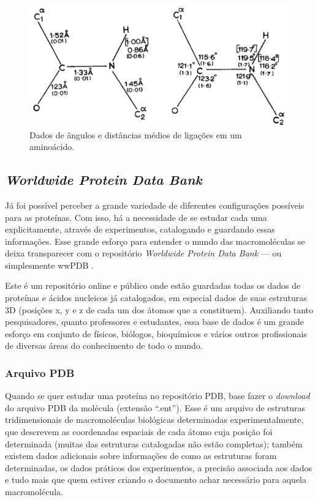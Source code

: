 \documentclass[a4paper,12pt]{article}
\begin{document}
	\begin{figure}[H]
		\begin{center}
			\includegraphics[width=0.8\linewidth]{rama.png}
		\end{center}
		\caption{Dados de ângulos e distâncias médios de ligações em um aminoácido.}
		\label{fig:rama}
	\end{figure}
	
	
	\subsection{\textit{Worldwide Protein Data Bank}}
	Já foi possível perceber a grande variedade de diferentes configurações possíveis para as proteínas. Com isso, há a necessidade de se estudar cada uma explicitamente, através de experimentos, catalogando e guardando essas informações. Esse grande esforço para entender o mundo das macromoléculas se deixa transparecer com o repositório \textit{Worldwide Protein Data Bank} --- ou simplesmente wwPDB \cite{wwPDB}.
	
	Este é um repositório online e público onde estão guardadas todas os dados de proteínas e ácidos nucleicos já catalogados, em especial dados de suas estruturas 3D (posições x, y e z de cada um dos átomos que a constituem). Auxiliando tanto pesquisadores, quanto professores e estudantes, essa base de dados é um grande esforço em conjunto de físicos, biólogos, bioquímicos e vários outros profissionais de diversas áreas do conhecimento de todo o mundo.
	
	\subsubsection*{Arquivo PDB}
	Quando se quer estudar uma proteína no repositório PDB, base fazer o \textit{download} do arquivo PDB da molécula (extensão ``.ent''). Esse é um arquivo de estruturas tridimensionais de macromoléculas biológicas determinadas experimentalmente, que descrevem as coordenadas espaciais de cada átomo cuja posição foi determinada (muitas das estruturas catalogadas não estão completas); também existem dados adicionais sobre informações de como as estruturas foram determinadas, os dados práticos dos experimentos, a precisão associada aos dados e tudo mais que quem estiver criando o documento achar necessário para aquela macromolécula.
	
\end{document}
